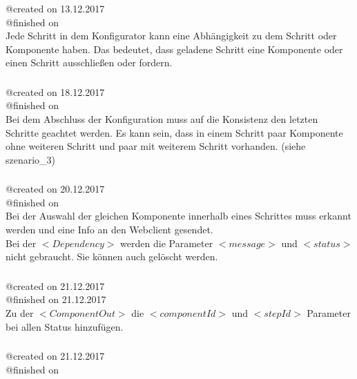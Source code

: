 \documentclass{article}
\begin{document}
\subsubsection{}
@created on 13.12.2017\\
@finished on \\
Jede Schritt in dem Konfigurator kann eine Abh\"angigkeit zu dem Schritt oder
Komponente haben. Das bedeutet, dass geladene Schritt eine Komponente oder einen
Schritt ausschlie\ss{}en oder fordern.\\

\subsubsection{}
@created on 18.12.2017\\
@finished on \\

Bei dem Abschluss der Konfiguration muss auf die Konsistenz den letzten
Schritte geachtet werden. Es kann sein, dass in einem Schritt paar Komponente
ohne weiteren Schritt und paar mit weiterem Schritt vorhanden. (siehe
szenario\_3)\\

\subsubsection{}
@created on 20.12.2017\\
@finished on \\

Bei der Auswahl der gleichen Komponente innerhalb eines Schrittes muss erkannt
werden und eine Info an den Webclient gesendet.\\

Bei der $<Dependency>$ werden die Parameter $<message>$ und $<status>$ nicht
gebraucht. Sie k\"onnen auch gel\"oscht werden.\\

\subsubsection{}
@created on 21.12.2017\\
@finished on 21.12.2017\\

Zu der $<ComponentOut>$ die $<componentId>$ und $<stepId>$ Parameter bei
allen Status hinzuf\"ugen.\\

\subsubsection{}
@created on 21.12.2017\\
@finished on \\
\end{document}
